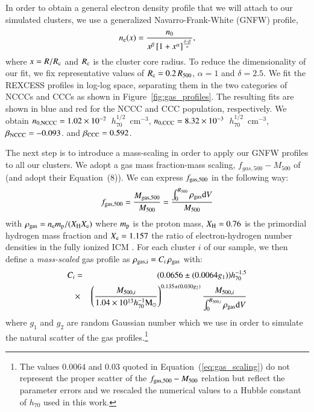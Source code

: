 \documentclass[traditabstract]{aa}
\newcommand{\rmn}{\mathrm}
\begin{document}
In order to obtain a general electron density profile that we will attach to our
simulated clusters, we use a generalized Navarro-Frank-White (GNFW) profile,
\begin{equation}
n_{\rm{e}}(x) = \frac{n_{0}}{x^{\beta}\left[1+x^{\alpha}\right]^{\frac{\delta-\beta}{\alpha}}},
\label{eq:gnfw}
\end{equation}
where $x=R/R_{\rm{c}}$ and $R_{\rm{c}}$ is the cluster core radius. To reduce
the dimensionality of our fit, we fix representative values of $R_{\rm{c}} =
0.2\, R_{500}$, $\alpha = 1$ and $\delta = 2.5$. We fit the REXCESS profiles in
log-log space, separating them in the two categories of NCCCs and CCCs as shown
in Figure~\ref{fig:gas_profiles}. The resulting fits are shown in blue and red
for the NCCC and CCC population, respectively. We obtain $n_{\rm{0,NCCC}} =
1.02\times10^{-2}$~$h_{70}^{1/2}$~cm$^{-3}$, $n_{\rm{0,CCC}} =
8.32\times10^{-3}$~$h_{70}^{1/2}$~cm$^{-3}$, $\beta_{\rm{NCCC}} = -0.093$. and
$\beta_{\rm{CCC}} = 0.592$.

The next step is to introduce a mass-scaling in order to apply our GNFW profiles
to all our clusters. We adopt a gas mass fraction-mass scaling,
$f_{gas,500}-M_{500}$ of \cite{2009ApJ...693.1142S} (and adopt their Equation~(8)). We can
express $f_{\rm{gas},500}$ in the following way:
\begin{equation}
f_{\rm{gas},500} = \frac{M_{\rm{gas},500}}{M_{500}}  = \frac{\int_{0}^{R_{500}} \rho_{\rm{gas}} \rmn{d}V}{M_{500}}
\label{eq:m500}
\end{equation}
with $\rho_{\rm{gas}} = n_{\rm{e}} m_{\rm{p}} / ( X_{\rm{H}}X_{\rm{e}} )$ where
$m_{\rm{p}}$ is the proton mass, $X_{\rm{H}} = 0.76$ is the primordial hydrogen
mass fraction and $X_{\rm{e}} = 1.157$ the ratio of electron-hydrogen number
densities in the fully ionized ICM \citep{1988xrec.book.....S}. For each cluster
$i$ of our sample, we then define a \emph{mass-scaled} gas profile as
$\rho_{\rm{gas},i}=C_{i} \,\rho_{\rm{gas}}$ with:
\begin{eqnarray}
C_{i}  & = &  (0.0656\pm(0.0064g_{1}))  h_{70}^{-1.5}  \nonumber \\
 & \times & \left(\frac{M_{500,i}}{1.04 \times 10^{13} h_{70}^{-1} \rmn{M_{\odot}}}\right)^{0.135\pm(0.030g_{2})} \frac{M_{500,i}}{\int_{0}^{R_{500,i}} \rho_{\rm{gas}} \rmn{d}V}
\label{eq:gas_scaling}
\end{eqnarray}
where $g_{1}$ and $g_{2}$ are random Gaussian number which we use in order to
simulate the natural scatter of the gas profiles.\footnote[4]{The values
  $0.0064$ and $0.03$ quoted in Equation~(\ref{eq:gas_scaling}) do not represent
  the proper scatter of the $f_{\rm{gas},500}-M_{500}$ relation but reflect the
  parameter errors and we rescaled the numerical values to a Hubble constant of
  $h_{70}$ used in this work.}
\end{document}
